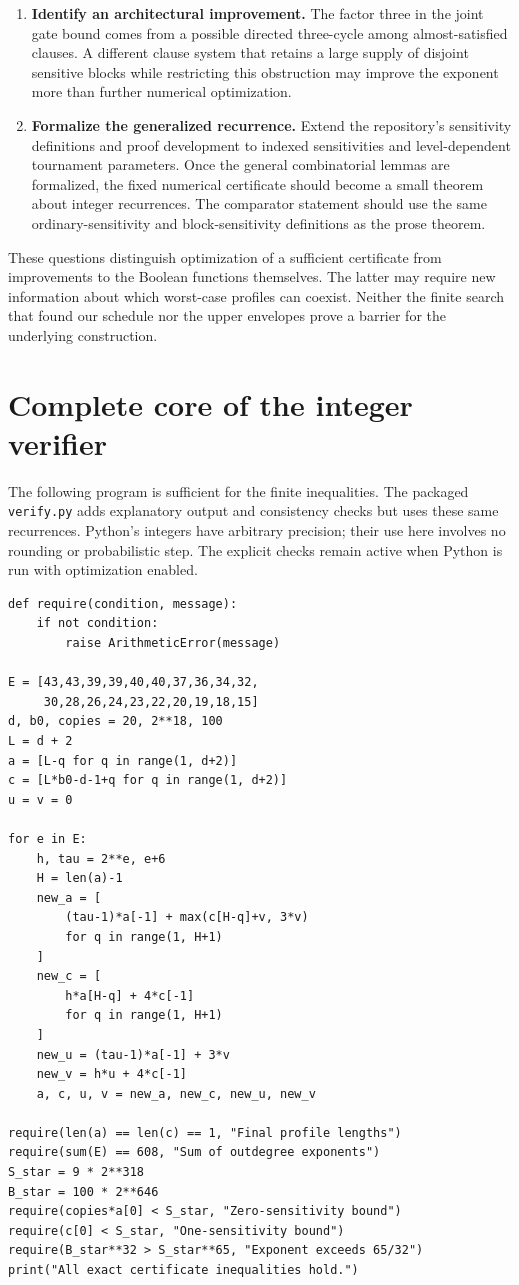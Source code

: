 \documentclass[11pt]{article}
\theoremstyle{definition}
\theoremstyle{remark}
\begin{document}
\begin{enumerate}
\item \textbf{Identify an architectural improvement.}
The factor three in the joint gate bound comes from a possible directed
three-cycle among almost-satisfied clauses.  A different clause system
that retains a large supply of disjoint sensitive blocks while
restricting this obstruction may improve the exponent more than further
numerical optimization.

\item \textbf{Formalize the generalized recurrence.}
Extend the repository's sensitivity definitions and proof development to
indexed sensitivities and level-dependent tournament parameters.  Once
the general combinatorial lemmas are formalized, the fixed numerical
certificate should become a small theorem about integer recurrences.
The comparator statement should use the same ordinary-sensitivity and
block-sensitivity definitions as the prose theorem.
\end{enumerate}

These questions distinguish optimization of a sufficient certificate
from improvements to the Boolean functions themselves.  The latter may
require new information about which worst-case profiles can coexist.
Neither the finite search that found our schedule nor the upper
envelopes prove a barrier for the underlying construction.

\appendix
\section{Complete core of the integer verifier}
\label{app:verifier}

The following program is sufficient for the finite inequalities.  The
packaged \texttt{verify.py} adds explanatory output and consistency
checks but uses these same recurrences.  Python's integers have arbitrary
precision; their use here involves no rounding or probabilistic step.
The explicit checks remain active when Python is run with optimization
enabled.

\begingroup
\small
\begin{verbatim}
def require(condition, message):
    if not condition:
        raise ArithmeticError(message)

E = [43,43,39,39,40,40,37,36,34,32,
     30,28,26,24,23,22,20,19,18,15]
d, b0, copies = 20, 2**18, 100
L = d + 2
a = [L-q for q in range(1, d+2)]
c = [L*b0-d-1+q for q in range(1, d+2)]
u = v = 0

for e in E:
    h, tau = 2**e, e+6
    H = len(a)-1
    new_a = [
        (tau-1)*a[-1] + max(c[H-q]+v, 3*v)
        for q in range(1, H+1)
    ]
    new_c = [
        h*a[H-q] + 4*c[-1]
        for q in range(1, H+1)
    ]
    new_u = (tau-1)*a[-1] + 3*v
    new_v = h*u + 4*c[-1]
    a, c, u, v = new_a, new_c, new_u, new_v

require(len(a) == len(c) == 1, "Final profile lengths")
require(sum(E) == 608, "Sum of outdegree exponents")
S_star = 9 * 2**318
B_star = 100 * 2**646
require(copies*a[0] < S_star, "Zero-sensitivity bound")
require(c[0] < S_star, "One-sensitivity bound")
require(B_star**32 > S_star**65, "Exponent exceeds 65/32")
print("All exact certificate inequalities hold.")
\end{verbatim}
\endgroup
\end{document}
